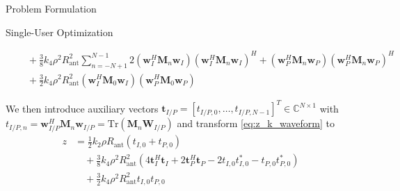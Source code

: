 \documentclass{IEEEtran}
\begin{document}
\begin{section}{Problem Formulation}
\begin{subsection}{Single-User Optimization}
\begin{figure*}[b]
\begin{equation}
\begin{split}
					&\quad+\frac{3}{8}{k_4}{\rho^2}{R_{\text{ant}}^2}\sum_{n=-N+1}^{N-1}{2(\boldsymbol{w}_I^H\boldsymbol{M}_n\boldsymbol{w}_I)(\boldsymbol{w}_I^H\boldsymbol{M}_n\boldsymbol{w}_I)^H+(\boldsymbol{w}_P^H\boldsymbol{M}_n\boldsymbol{w}_P)(\boldsymbol{w}_P^H\boldsymbol{M}_n\boldsymbol{w}_P)^H}\\
					&\quad+\frac{3}{2}{k_4}{\rho^2}{R_{\text{ant}}^2}{(\boldsymbol{w}_I^H\boldsymbol{M}_0\boldsymbol{w}_I)(\boldsymbol{w}_P^H\boldsymbol{M}_0\boldsymbol{w}_P)}
				\end{split}
			\end{equation}
		\end{figure*}
		We then introduce auxiliary vectors $\boldsymbol{t}_{I/P}=[t_{{I/P},0},\dots,t_{{I/P},N-1}]^T \in \mathbb{C}^{N \times 1}$ with $t_{{I/P},n}=\boldsymbol{w}_{I/P}^H\boldsymbol{M}_n\boldsymbol{w}_{I/P}=\mathrm{Tr}(\boldsymbol{M}_n\boldsymbol{W}_{I/P})$ and transform \ref{eq:z_k_waveform} to
		\begin{equation}\label{eq:z_k_su_compact}
			\begin{split}
				z
				&=\frac{1}{2}{k_2}{\rho}{R_{\text{ant}}}(t_{I,0}+t_{P,0})\\
				&\quad+\frac{3}{8}{k_4}{\rho^2}{R_{\text{ant}}^2}(4\boldsymbol{t}_I^H\boldsymbol{t}_I+2\boldsymbol{t}_P^H\boldsymbol{t}_P-2t_{I,0}t_{I,0}^*-t_{P,0}t_{P,0}^*)\\
				&\quad+\frac{3}{2}{k_4}{\rho^2}{R_{\text{ant}}^2}t_{I,0}t_{P,0}
			\end{split}
		\end{equation}









\end{subsection}
\end{section}
\end{document}
